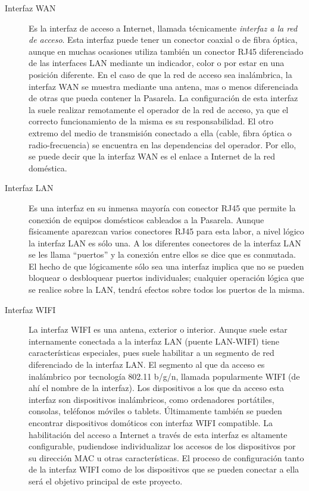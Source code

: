 \documentclass[12pt]{article}
\begin{document}
    \begin{description}
        \item[Interfaz WAN] Es la interfaz de acceso a Internet, llamada técnicamente \textit{interfaz a la red de acceso}. Esta interfaz puede tener un conector coaxial o de fibra óptica, aunque en muchas ocasiones utiliza también un conector RJ45 diferenciado de las interfaces LAN mediante un indicador, color o por estar en una posición diferente. En el caso de que la red de acceso sea inalámbrica, la interfaz WAN se muestra mediante una antena, mas o menos diferenciada de otras que pueda contener la Pasarela. La configuración de esta interfaz la suele realizar remotamente el operador de la red de acceso, ya que el correcto funcionamiento de la misma es su responsabilidad. El otro extremo del medio de transmisión conectado a ella (cable, fibra óptica o radio-frecuencia) se encuentra en las dependencias del operador. Por ello, se puede decir que la interfaz WAN es el enlace a Internet de la red doméstica.
        \item[Interfaz LAN] Es una interfaz en su inmensa mayoría con conector RJ45 que permite la conexión de equipos domésticos cableados a la Pasarela. Aunque físicamente aparezcan varios conectores RJ45 para esta labor, a nivel lógico la interfaz LAN es sólo una. A los diferentes conectores de la interfaz LAN se les llama ``puertos'' y la conexión entre ellos se dice que es conmutada. El hecho de que lógicamente sólo sea una interfaz implica que no se pueden bloquear o desbloquear puertos individuales; cualquier operación lógica que se realice sobre la LAN, tendrá efectos sobre todos los puertos de la misma.
        \item[Interfaz WIFI] La interfaz WIFI es una antena, exterior o interior. Aunque suele estar internamente conectada a la interfaz LAN (puente LAN-WIFI) tiene características especiales, pues suele habilitar a un segmento de red diferenciado de la interfaz LAN. El segmento al que da acceso es inalámbrico por tecnología 802.11 b/g/n, llamada popularmente WIFI (de ahí el nombre de la interfaz). Los dispositivos a los que da acceso esta interfaz son dispositivos inalámbricos, como ordenadores portátiles, consolas, teléfonos móviles o tablets. Últimamente también se pueden encontrar dispositivos domóticos con interfaz WIFI compatible. La habilitación del acceso a Internet a través de esta interfaz es altamente configurable, pudiendose individualizar los accesos de los dispositivos por su dirección MAC u otras características. El proceso de configuración tanto de la interfaz WIFI como de los dispositivos que se pueden conectar a ella será el objetivo principal de este proyecto.
    \end{description}
\end{document}
